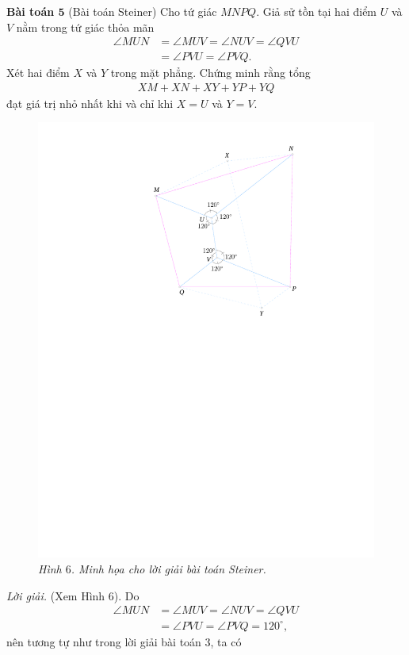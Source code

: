 \begin{multicols}{2}
	\vskip 0.1cm
	\textbf{\color{cackithi}Bài toán $\pmb{5}$} (Bài toán Steiner) Cho tứ giác $MNPQ$. Giả sử tồn tại hai điểm $U$ và $V$ nằm trong tứ giác thỏa mãn
	\begin{align*}
		\angle MUN&= \angle MUV= \angle NUV = \angle QVU\\
		&= \angle PVU=\angle PVQ.
	\end{align*}
	Xét hai điểm $X$ và $Y$ trong mặt phẳng. Chứng minh rằng tổng
	\begin{align*}
		XM+XN+XY+YP+YQ
	\end{align*}
	đạt giá trị nhỏ nhất khi và chỉ khi $X=U$ và $Y=V$.
	\begin{figure}[H]
		\vspace*{-5pt}
		\centering
		\captionsetup{labelformat= empty, justification=centering}
		\includegraphics[width= 0.75\linewidth]{figure8058}
		\caption{\small\textit{\color{cackithi}Hình $6$. Minh họa cho lời giải bài toán Steiner.}}
		\vspace*{-10pt}
	\end{figure}
	\textit{Lời giải.} (Xem Hình $6$). Do 
	\begin{align*}
		\angle MUN&=\angle MUV=\angle NUV=\angle QVU\\
		&=\angle PVU=\angle PVQ=120^\circ,
	\end{align*} nên tương tự như trong lời giải bài toán $3$, ta có
		\begin{align*}

\end{align*}
\end{multicols}
